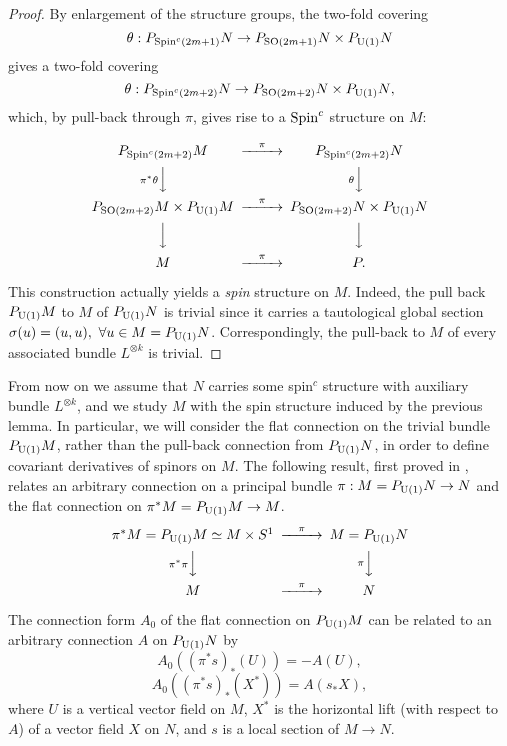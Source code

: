 \documentclass[12pt]{amsart}
\begin{document}
\begin{proof} 
By enlargement of the structure groups, the two-fold covering
$$\theta:{P_{{{\rm Spin}}^c(2m+1)}N}\to{P_{{{\rm SO}}(2m+1)}N}\times{P_{{{\rm U}}(1)}N}$$
gives a two-fold covering
$$\theta:{P_{{{\rm Spin}}^c(2m+2)}N}\to{P_{{{\rm SO}}(2m+2)}N}\times{P_{{{\rm U}}(1)}N},$$
which, by pull-back through $\pi$, gives rise to a $\hbox{Spin}^c$
structure on $M$:

\[
\begin{CD}
{P_{{{\rm Spin}}^c(2m+2)}M} 		@>{\pi}>> 	& {P_{{{\rm Spin}}^c(2m+2)}N} \\
@V{\pi^*\theta}VV 			& @V{\theta}VV\\
{P_{{{\rm SO}}(2m+2)}M}\times{P_{{{\rm U}}(1)}M} 	@>{\pi}>> 	& {P_{{{\rm SO}}(2m+2)}N}\times{P_{{{\rm U}}(1)}N}\\
@VVV					& @VVV\\
M			@>{\pi}>>	& P.
\end{CD}
\]  

This construction actually yields a {\it spin} structure on
$M$. Indeed, the pull back ${P_{{{\rm U}}(1)}M}$ to $M$ of ${P_{{{\rm U}}(1)}N}$ is trivial since it
carries a tautological global section $\sigma(u)=(u,u),\ \forall u\in M={P_{{{\rm U}}(1)}N}$.
Correspondingly, the pull-back to $M$ of every associated bundle $L^{\otimes k}$ 
is trivial.
\end{proof}

From now on we assume that $N$ carries some spin$^c$ structure with 
auxiliary bundle $L^{\otimes k}$, and we study $M$ with the spin structure 
induced by the previous lemma. In particular, we will consider the 
flat connection on the trivial bundle ${P_{{{\rm U}}(1)}M}$, rather than the pull-back 
connection from ${P_{{{\rm U}}(1)}N}$, in order to define covariant derivatives of spinors 
on $M$. The following result, first proved in \cite{m98}, relates an
arbitrary connection on a principal bundle $\pi:M=P_{{{\rm U}}(1)}N\to N$ and the flat
connection on $\pi^*M=P_{{{\rm U}}(1)}M\to M$.
\[
\begin{CD}
\pi^*M=P_{{{\rm U}}(1)}M\simeq M\times S^1 @>{ \pi}>>
& M=P_{{{\rm U}}(1)}N\\
@V{\pi^*\pi}VV&@V{\pi}VV\\
M@>{\pi}>> & N
\end{CD}
\]  

\begin{lemma} \label{hor} The connection form $A_0$ of the flat
  connection on $P_{{{\rm U}}(1)}M$ can be related to an arbitrary connection
  $A$ on $P_{{{\rm U}}(1)}N$ by 
$$ A_0((\pi^*s)_*(U))=-A(U),$$
$$ A_0((\pi^*s)_*(X^*))=A(s_*X),$$
where $U$ is a vertical vector field on $M$, $X^*$ is the horizontal
lift (with respect to $A$) of a vector field $X$ on $N$, and $s$ is a
local section of $M\to N$. 
\end{lemma}
  
\end{document}
